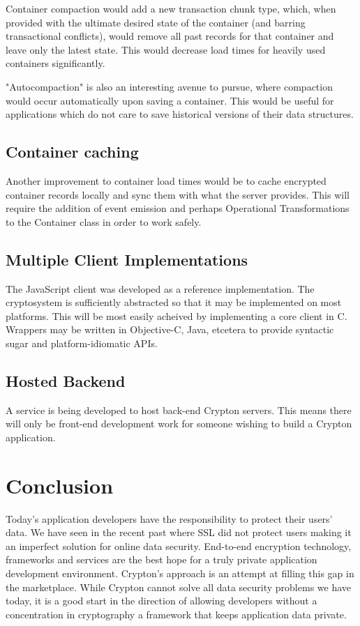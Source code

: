 \documentclass[conference]{IEEEtran}
\begin{document}
Container compaction would add a new transaction chunk type, which, when provided with
the ultimate desired state of the container (and barring transactional conflicts),
would remove all past records for that container and leave only the latest state.
This would decrease load times for heavily used containers significantly.

"Autocompaction" is also an interesting avenue to pursue, where compaction would occur
automatically upon saving a container. This would be useful for applications which
do not care to save historical versions of their data structures.

\subsection{Container caching}
Another improvement to container load times would be to cache encrypted container
records locally and sync them with what the server provides. This will require the
addition of event emission and perhaps Operational Transformations to the Container
class in order to work safely.

\subsection{Multiple Client Implementations}
The JavaScript client was developed as a reference implementation. The cryptosystem
is sufficiently abstracted so that it may be implemented on most platforms. This
will be most easily acheived by implementing a core client in C. Wrappers may be
written in Objective-C, Java, etcetera to provide syntactic sugar and
platform-idiomatic APIs.

\subsection{Hosted Backend}
A service is being developed to host back-end Crypton servers. This means there
will only be front-end development work for someone wishing to build a Crypton
application.

\section{Conclusion}
Today's application developers have the responsibility to protect their users' data.
We have seen in the recent past where SSL did not protect users\cite{SSLImpersonation}
making it an imperfect solution for online data security. End-to-end encryption
technology, frameworks and services are the best hope for a truly private application
development environment. Crypton's approach is an attempt at filling this gap in the
marketplace. While Crypton cannot solve all data security problems we have today, it is
a good start in the direction of allowing developers without a concentration in
cryptography a framework that keeps application data private.
\end{document}
